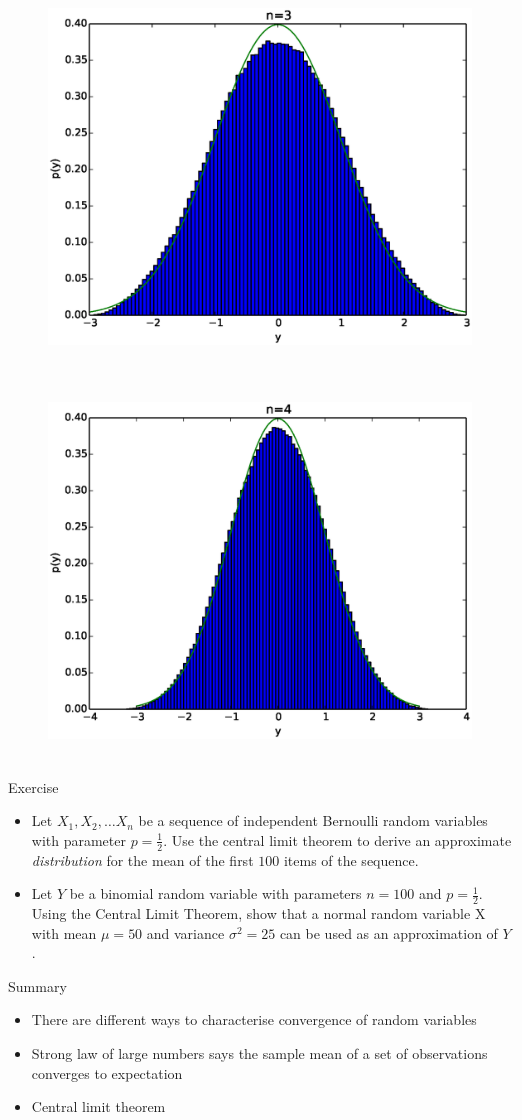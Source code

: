 \documentclass{beamer}
\begin{document}
\begin{frame} 
  \begin{figure}[htp]
\mbox{
\includegraphics[width=0.5\linewidth]{clt2.eps}
}
\end{figure} 
\end{frame}


\begin{frame} 
  \begin{figure}[htp]
\mbox{
\includegraphics[width=0.5\linewidth]{clt3.eps}
}
\end{figure} 
\end{frame}

\begin{frame}{Exercise}  
\begin{itemize} 
 \item Let $X_1, X_2, \ldots X_n$ be a sequence of independent Bernoulli random variables with parameter $p = \frac{1}{2}$. Use the central limit theorem to derive an approximate \emph{distribution} for the mean of the first $100$ items of the sequence. 
  \item Let $Y$ be a binomial random variable with parameters $n=100$ and $p = \frac{1}{2}$. Using the Central Limit Theorem, show that a normal random variable X with mean $\mu =50$ and variance $\sigma^{2}=25$ can be used as an approximation of $Y$. 
\end{itemize}
\end{frame}




\begin{frame}{Summary} 
\begin{itemize} 
 \item There are different ways to characterise convergence of random variables 
 \item Strong law of large numbers says the sample mean of a set of observations converges to expectation 
 \item Central limit theorem 
\end{itemize}
 
\end{frame}
\end{document}
